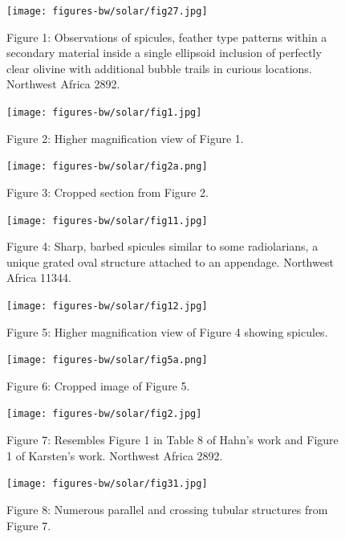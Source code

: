 \documentclass[a4paper, 12pt, oneside]{article}
\begin{document}
\begin{figure}[b]
\texttt{[image: figures-bw/solar/fig27.jpg]}
\caption{Figure 1: Observations of spicules, feather type patterns within a secondary material inside a single ellipsoid inclusion of perfectly clear olivine with additional bubble trails in curious locations. Northwest Africa 2892.}
\centering
\end{figure}
\clearpage

\begin{figure}[b]
\centering
\texttt{[image: figures-bw/solar/fig1.jpg]}
\caption{Figure 2: Higher magnification view of Figure 1.}
\end{figure}
\clearpage

\begin{figure}[b]
\texttt{[image: figures-bw/solar/fig2a.png]}
\caption{Figure 3: Cropped section from Figure 2.}
\centering
\end{figure}
\clearpage

\begin{figure}[b]
\texttt{[image: figures-bw/solar/fig11.jpg]}
\caption{Figure 4: Sharp, barbed spicules similar to some radiolarians, a unique grated oval structure attached to an appendage. Northwest Africa 11344.}
\centering
\end{figure}
\clearpage

\begin{figure}[b]
\centering
\texttt{[image: figures-bw/solar/fig12.jpg]}
\caption{Figure 5: Higher magnification view of Figure 4 showing spicules.}
\end{figure}
\clearpage

\begin{figure}[b]
\centering
\texttt{[image: figures-bw/solar/fig5a.png]}
\caption{Figure 6: Cropped image of Figure 5.}
\end{figure}
\clearpage

\begin{figure}[b]
\texttt{[image: figures-bw/solar/fig2.jpg]}
\caption{Figure 7: Resembles Figure 1 in Table 8 of Hahn's work and Figure 1 of Karsten's work. Northwest Africa 2892.}
\centering
\end{figure}
\clearpage

\begin{figure}[b]
\centering
\texttt{[image: figures-bw/solar/fig31.jpg]}
\caption{Figure 8: Numerous parallel and crossing tubular structures from Figure 7.}
\end{figure}
\clearpage
\end{document}
